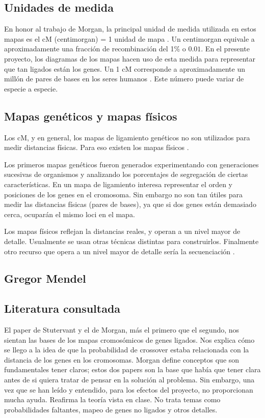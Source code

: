 \documentclass{article}
\begin{document}
	\subsection{Unidades de medida}
	
	En honor al trabajo de Morgan, la principal unidad de medida utilizada en estos mapas es el cM (centimorgan) = 1 unidad de mapa \cite{terwilliger1994handbook}. Un centimorgan equivale a aproximadamente una fracción de recombinación del 1\% o $0.01$. En el presente proyecto, los diagramas de los mapas hacen uso de esta medida para representar que tan ligados están los genes. Un 1 cM corresponde a aproximadamente un millón de pares de bases en los seres humanos \cite{lodish2008molecular}. Este número puede variar de especie a especie.
	
	\subsection{Mapas genéticos y mapas físicos}
	
	Los cM, y en general, los mapas de ligamiento genéticos no son utilizados para medir distancias físicas. Para eso existen los mapas físicos \cite{setubal1997introduction}.
	
	Los primeros mapas genéticos fueron generados experimentando con generaciones sucesivas de organismos y analizando los porcentajes de segregación de ciertas características. En un mapa de ligamiento interesa representar el orden y posiciones de los genes en el cromosoma. Sin embargo no son tan útiles para medir las distancias físicas (pares de bases), ya que si dos genes están demasiado cerca, ocuparán el mismo loci en el mapa.
	
	Los mapas físicos reflejan la distancias reales, y operan a un nivel mayor de detalle. Usualmente se usan otras técnicas distintas para construirlos. Finalmente otro recurso que opera a un nivel mayor de detalle sería la secuenciación \cite{setubal1997introduction}.
	
	\subsection{Gregor Mendel}
	
	
	
	\subsection{Literatura consultada}
	El paper de Stutervant y el de Morgan, más el primero que el segundo, nos sientan las bases de los mapas cromosómicos de genes ligados. Nos explica cómo se llego a la idea de que la probabilidad de crossover estaba relacionada con la distancia de los genes en los cromosomas.  Morgan define conceptos que son fundamentales tener claros; estos dos papers son la base que había que tener clara antes de si quiera tratar de pensar en la solución al problema. Sin embargo, una vez que se han leído y entendido, para los efectos del proyecto, no proporcionan mucha ayuda. Reafirma la teoría vista en clase. No trata temas como probabilidades faltantes, mapeo de genes no ligados y otros detalles.
\end{document}
